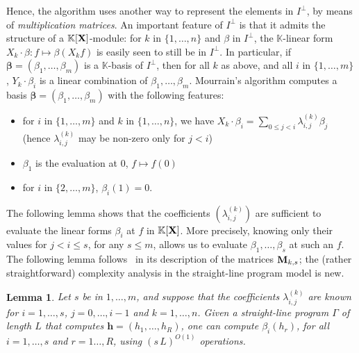 \documentclass[11pt]{article}
\numberwithin{Property}{section}
\numberwithin{Theorem}{section}
\numberwithin{Proposition}{section}
\newtheorem{Lemma}{Lemma}%
\numberwithin{Lemma}{section}
\numberwithin{Corollary}{section}
\numberwithin{Definition}{section}
\numberwithin{Remark}{section}
\numberwithin{Conjecture}{section}
\numberwithin{Problem}{section}
\numberwithin{Claim}{section}
\theoremstyle{definition}
\numberwithin{Example}{section}
\renewcommand{\le}{\leqslant}
\renewcommand{\le}{\leqslant} %
\newcommand{\field}{\mathbb{K}} %
\newcommand{\mat}[1]{\mathbf{\MakeUppercase{#1}}} %
\begin{document}
Hence, the algorithm uses another way to represent the elements in $I^{\perp}$, by means of {\em multiplication matrices}. An important feature of $I^{\perp}$ is that it admits the structure of a $\field[\mat{X}]$-module: for $k$ in $\{1,\dots,n\}$ and $\beta$ in $I^{\perp}$, the $\field$-linear form $X_k \cdot \beta: f \mapsto
\beta(X_k f)$ is easily seen to still be in $I^{\perp}$.  In particular, if $\bm{\beta}=(\beta_1,\dots,\beta_m)$ is a $\field$-basis of $I^{\perp}$, then for all $k$ as above, and all $i$ in $\{1,\dots,m\}$, $Y_k \cdot \beta_i$ is a linear combination of $\beta_1,\dots,\beta_m$. Mourrain's algorithm computes a
basis $\bm{\beta} = (\beta_1,\dots,\beta_m)$ with the following features:
\begin{itemize}
\item for $i$ in $\{1,\dots,m\}$ and $k$ in $\{1,\dots,n\}$, we have
  $X_k \cdot \beta_i=\sum_{0 \le j < i} \lambda^{(k)}_{i,j} \beta_j$
  (hence $\lambda^{(k)}_{i,j}$ may be non-zero 
  only for $j<i$)
\item $\beta_1$ is the evaluation at $0$, $f \mapsto f(0)$
\item for $i$ in $\{2,\dots,m\}$, $\beta_i(1)=0$.
\end{itemize}
The following lemma shows that the coefficients $(\lambda^{(k)}_{i,j})$ are sufficient to evaluate  the linear forms $\beta_i$ at $f$ in $\field[\mat{X}]$. More precisely, knowing only their values for $j < i \le s$, for any $s \le m$, allows us to evaluate $\beta_1,\dots,\beta_s$ at such an $f$. The following lemma follows~\cite{Mourrain97} in its description of the matrices $\mat{M}_{k,s}$; the (rather straightforward) complexity analysis in the straight-line program model is new.
\begin{Lemma}\label{lemma:evalbeta} Let $s$ be in $1,\dots,m$, and suppose that the coefficients $\lambda^{(k)}_{i,j}$ are known for $i=1,\dots,s$, $j=0,\dots,i-1$ and $k=1,\dots,n$. Given a straight-line program $\Gamma$ of length $L$ that computes $\mathbf{h}=(h_1,\dots,h_R)$, one can compute $\beta_i(h_r)$, for all $i=1,\dots,s$ and $r=1 \dots,R$, using $(s\,L)^{O(1)}$ operations.
\end{Lemma}
\end{document}
